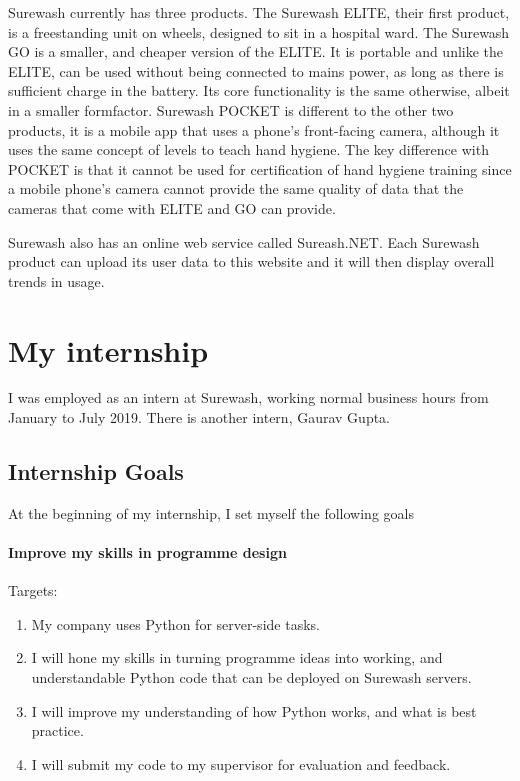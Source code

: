 Surewash currently has three products. The Surewash ELITE, their first product, is a freestanding unit on wheels, designed to sit in a hospital ward. The Surewash GO is a smaller, and cheaper version of the ELITE. It is portable and unlike the ELITE, can be used without being connected to mains power, as long as there is sufficient charge in the battery. Its core functionality is the same otherwise, albeit in a smaller formfactor. Surewash POCKET is different to the other two products, it is a mobile app that uses a phone's front-facing camera, although it uses the same concept of levels to teach hand hygiene. The key difference with POCKET is that it cannot be used for certification of hand hygiene training since a mobile phone's camera cannot provide the same quality of data that the cameras that come with ELITE and GO can provide.

Surewash also has an online web service called Sureash.NET. Each Surewash product can upload its user data to this website and it will then display overall trends in usage.

\section{My internship}
I was employed as an intern at Surewash, working normal business hours from January to July 2019. There is another intern, Gaurav Gupta.
    \subsection{Internship Goals}
    At the beginning of my internship, I set myself the following goals
        \paragraph{Improve my skills in programme design}
        Targets:
        \begin{enumerate}
            \item My company uses Python for server-side tasks.
            \item I will hone my skills in turning programme ideas into working, and understandable Python code that can be deployed on Surewash servers.
            \item I will improve my understanding of how Python works, and what is best practice.
            \item I will submit my code to my supervisor for evaluation and feedback.
        \end{enumerate}
    
